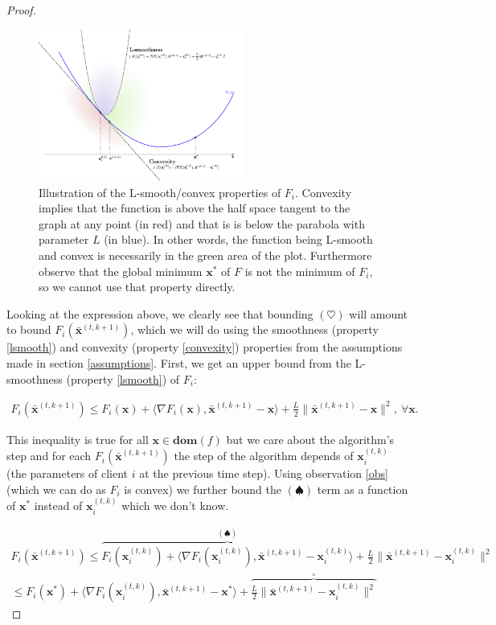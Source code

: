 \begin{proof}
\begin{figure}[h!]
    \centering
    \includegraphics[width=0.6\textwidth]{figures/smooth_convex.pdf}
    \caption{Illustration of the L-smooth/convex properties of $F_i$. Convexity implies that the function is above the half space tangent to the graph at any point (in red) and that is is below the parabola with parameter $L$ (in blue). In other words, the function being L-smooth and convex is necessarily in the green area of the plot. Furthermore observe that the global minimum $\bm{x}^*$ of $F$ is not the minimum of $F_i$, so we cannot use that property directly.}
\end{figure}

Looking at the expression above, we clearly see that bounding $(\heartsuit)$ will amount to bound $F_i(\bar{\bm{x}}^{(t,k+1)})$, which we will do using the smoothness (property \ref{lsmooth}) and convexity (property \ref{convexity}) properties from the assumptions made in section \ref{assumptions}. First, we get an upper bound from the L-smoothness (property \ref{lsmooth}) of $F_i$:

\begin{align*}
    F_i(\bar{\bm{x}}^{(t,k+1)}) \leq  F_i(\bm{x}) +  \langle \nabla F_i(\bm{x}) ,\bar{\bm{x}}^{(t,k+1)}-\bm{x} \rangle +  \frac{L}{2} \|\bar{\bm{x}}^{(t,k+1)}-\bm{x} \|^2, ~ \forall \bm{x}.
\end{align*}

This inequality is true for all $\bm{x} \in \bm{dom}(f)$ but we care about the algorithm's step and for each $F_i(\bar{\bm{x}}^{(t,k+1)})$ the step of the algorithm depends of $\bm{x}_i^{(t,k)}$ (the parameters of client $i$ at the previous time step). Using observation \ref{obs} (which we can do as $F_i$ is convex) we further bound the $(\spadesuit)$ term as a function of $\bm{x}^*$ instead of $\bm{x}_i^{(t,k)}$ which we don't know.

\begin{align*}
    F_i(\bar{\bm{x}}^{(t,k+1)}) \leq \overbrace{F_i(\bm{x}_i^{(t,k)}) +  \langle \nabla F_i(\bm{x}_i^{(t,k)}) ,\bar{\bm{x}}^{(t,k+1)}-\bm{x}_i^{(t,k)} \rangle}^{(\spadesuit)} +  \frac{L}{2} \|\bar{\bm{x}}^{(t,k+1)}-\bm{x}_i^{(t,k)} \|^2 \\
    \leq F_i(\bm{x}^{*}) +  \langle \nabla F_i(\bm{x}_i^{(t,k)}) ,\bar{\bm{x}}^{(t,k+1)} - \bm{x}^{*} \rangle + \overbrace{ \frac{L}{2} \|\bar{\bm{x}}^{(t,k+1)}-\bm{x}_i^{(t,k)} \|^2}^{\square}
\end{align*}


\end{proof}
